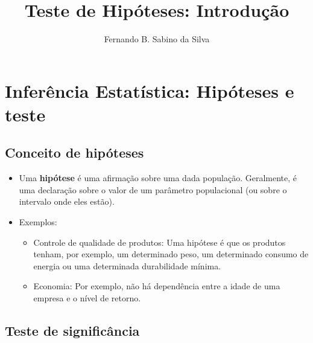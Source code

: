 \documentclass[]{article}
\title{Teste de Hipóteses: Introdução}
\author{Fernando B. Sabino da Silva}
\date{}
\providecommand{\tightlist}{%
  \setlength{\itemsep}{0pt}\setlength{\parskip}{0pt}}
\begin{document}
\maketitle

{
\setcounter{tocdepth}{2}
\tableofcontents
}
\section{Inferência Estatística: Hipóteses e
teste}\label{inferencia-estatistica-hipoteses-e-teste}

\subsection{Conceito de hipóteses}\label{conceito-de-hipoteses}

\begin{itemize}
\tightlist
\item
  Uma \textbf{hipótese} é uma afirmação sobre uma dada população.
  Geralmente, é uma declaração sobre o valor de um parâmetro
  populacional (ou sobre o intervalo onde eles estão).
\item
  Exemplos:

  \begin{itemize}
  \tightlist
  \item
    Controle de qualidade de produtos: Uma hipótese é que os produtos
    tenham, por exemplo, um determinado peso, um determinado consumo de
    energia ou uma determinada durabilidade mínima.
  \item
    Economia: Por exemplo, não há dependência entre a idade de uma
    empresa e o nível de retorno.
  \end{itemize}
\end{itemize}

\subsection{Teste de significância}\label{teste-de-significancia}
\end{document}
